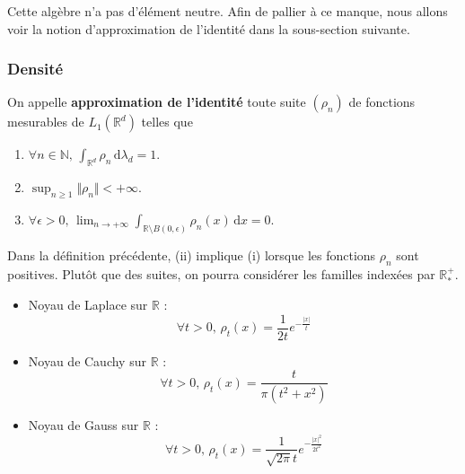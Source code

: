   \begin{remark}
    Cette algèbre n'a pas d'élément neutre. Afin de pallier à ce manque, nous allons voir la notion d'approximation de l'identité dans la sous-section suivante.
  \end{remark}

  \subsubsection{Densité}


  \begin{definition}
    On appelle \textbf{approximation de l'identité} toute suite $(\rho_n)$ de fonctions mesurables de $L_1(\mathbb{R}^d)$ telles que
    \begin{enumerate}[label=(\roman*)]
      \item $\forall n \in \mathbb{N}, \, \int_{\mathbb{R}^d} \rho_n \, \mathrm{d}\lambda_d = 1$.
      \item $\sup_{n \geq 1} \Vert \rho_n \Vert < +\infty$.
      \item $\forall \epsilon > 0, \, \lim_{n \rightarrow +\infty} \int_{\mathbb{R} \setminus B(0, \epsilon)} \rho_n(x) \, \mathrm{d}x = 0$.
    \end{enumerate}
  \end{definition}

  \begin{remark}
    Dans la définition précédente, (ii) implique (i) lorsque les fonctions $\rho_n$ sont positives. Plutôt que des suites, on pourra considérer les familles indexées par $\mathbb{R}_*^+$.
  \end{remark}

  \begin{example}
    \begin{itemize}
      \item Noyau de Laplace sur $\mathbb{R}$ :
      \[ \forall t > 0, \, \rho_t(x) = \frac{1}{2t}e^{-\frac{|x|}{t}} \]
      \item Noyau de Cauchy sur $\mathbb{R}$ :
      \[ \forall t > 0, \, \rho_t(x) = \frac{t}{\pi (t^2 + x^2)} \]
      \item Noyau de Gauss sur $\mathbb{R}$ :
      \[ \forall t > 0, \, \rho_t(x) = \frac{1}{\sqrt{2\pi} t}e^{-\frac{|x|^2}{2t^2}} \]
    \end{itemize}
  \end{example}


